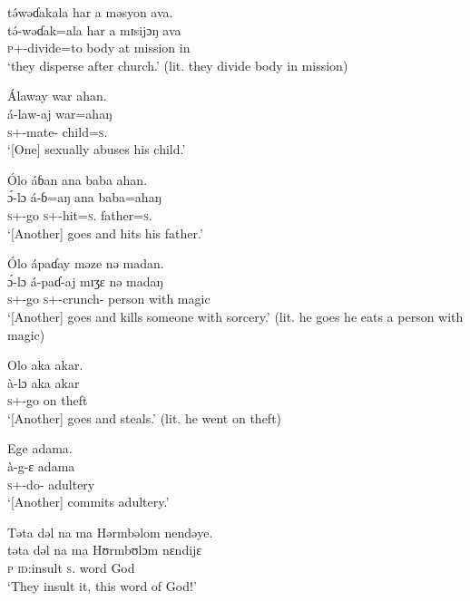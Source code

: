  \medskip
  t\'əwəɗakala  har  a  məsyon  ava.\\
 \gll t\'ə-wəɗak=ala   har   a   mɪsijɔŋ   ava\\
 \textsc{p}+{\IFV}-divide=to  body  at  mission  in\\
 \glt ‘they disperse after church.’ (lit. they divide body in mission)
 \z

\ea Álaway  war  ahan.\\
 \gll á-law-aj      war=ahaŋ\\
 \textsc{s}+{\IFV}-mate{}-{\CL}  child=\textsc{s}.{\POSS}\\
 \glt ‘[One] sexually abuses his child.’
 \z

\ea  Ólo  áɓan  ana  baba  ahan.\\ 
 \gll \'ɔ-lɔ     á-ɓ=aŋ   ana  baba=ahaŋ\\
 \textsc{s}+{\IFV}-go  \textsc{s}+{\IFV}-hit=\textsc{s}.{\IO}  {\DAT}       father=\textsc{s}.{\POSS}\\
 \glt ‘[Another] goes and hits his father.’ 
 \z

\ea Ólo  ápaɗay  məze  nə  madan. \\
 \gll \'ɔ{}-lɔ     á-paɗ-aj       mɪʒɛ   nə   madaŋ\\
 \textsc{s}+{\IFV}-go  \textsc{s}+{\IFV}-crunch{}-{\CL}  person  with  magic  \\
 \glt ‘[Another] goes and kills someone with sorcery.’ (lit. he goes he eats a person with magic)
 \z

\ea Olo  aka  akar.\\
 \gll à-lɔ         aka   akar\\
 \textsc{s}+{\PFV}-go   on  theft  \\
 \glt ‘[Another] goes and steals.’ (lit. he went on theft)
 \z

\ea Ege  adama.\\
 \gll à-g-ɛ     adama\\
 \textsc{s}+{\PFV}-do-{\CL}  adultery\\
 \glt ‘[Another] commits adultery.’ 
 \z

\ea Təta  dəl  na  ma  Hərmbəlom  nendəye.\\
 \gll təta   dəl     na   ma   Hʊrmbʊlɔm   nɛndijɛ\\
 \textsc{p}    \textsc{id}:insult    \textsc{s}.{\DO}  word  God    {\DEM}\\
 \glt ‘They insult it, this word of God!’
 \z

